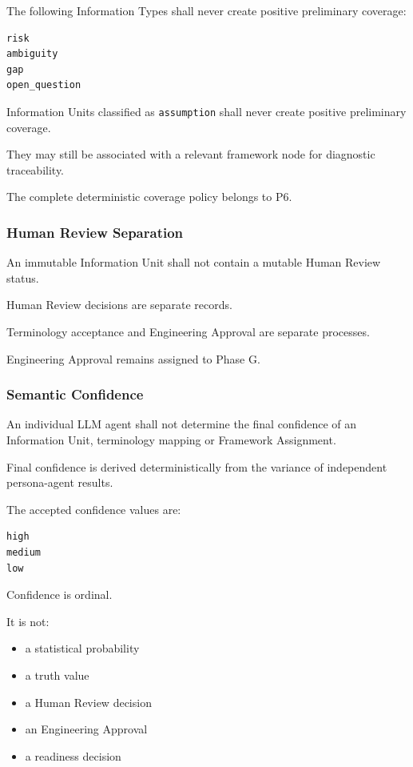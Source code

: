 The following Information Types shall never create positive preliminary coverage:

\begin{verbatim}
risk
ambiguity
gap
open_question
\end{verbatim}

Information Units classified as \texttt{assumption} shall never create positive preliminary coverage.

They may still be associated with a relevant framework node for diagnostic traceability.

The complete deterministic coverage policy belongs to P6.

\hypertarget{human-review-separation}{%
\subsubsection{Human Review Separation}\label{human-review-separation}}

An immutable Information Unit shall not contain a mutable Human Review status.

Human Review decisions are separate records.

Terminology acceptance and Engineering Approval are separate processes.

Engineering Approval remains assigned to Phase G.

\hypertarget{semantic-confidence}{%
\subsubsection{Semantic Confidence}\label{semantic-confidence}}

An individual LLM agent shall not determine the final confidence of an Information Unit, terminology mapping or Framework Assignment.

Final confidence is derived deterministically from the variance of independent persona-agent results.

The accepted confidence values are:

\begin{verbatim}
high
medium
low
\end{verbatim}

Confidence is ordinal.

It is not:

\begin{itemize}
\tightlist
\item
  a statistical probability
\item
  a truth value
\item
  a Human Review decision
\item
  an Engineering Approval
\item
  a readiness decision
\end{itemize}

